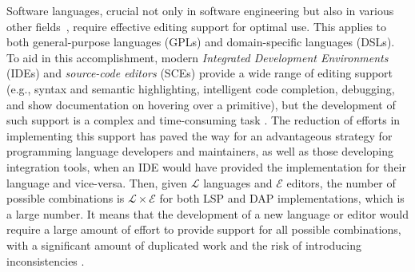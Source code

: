 
Software languages, crucial not only in software engineering but also in various other fields~\cite{Paulin93, Colmerauer90}, require effective editing support for optimal use.
This applies to both general-purpose languages (GPLs) and domain-specific languages (DSLs).
To aid in this accomplishment, modern \textit{Integrated Development Environments} (IDEs) and \textit{source-code editors} (SCEs) provide a wide range of editing support (e.g., syntax and semantic highlighting, intelligent code completion, debugging, and show documentation on hovering over a primitive), but the development of such support is a complex and time-consuming task \cite{Rodriguez-Echeverria18}.
The reduction of efforts in implementing this support has paved the way for an advantageous strategy for programming language developers and maintainers, as well as those developing integration tools, when an IDE would have provided the implementation for their language and vice-versa.
Then, given $\mathcal{L}$ languages and $\mathcal{E}$ editors, the number of possible combinations is $\mathcal{L} \times \mathcal{E}$ for both LSP and DAP implementations, which is a large number.
It means that the development of a new language or editor would require a large amount of effort to provide support for all possible combinations, with a significant amount of duplicated work and the risk of introducing inconsistencies \cite{Rask21}.

